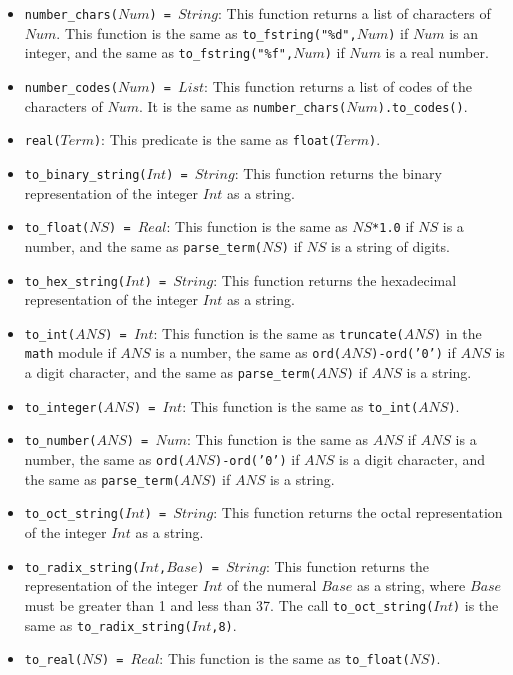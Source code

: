 \begin{itemize}
\item \texttt{number\_chars($Num$) = $String$}: This function returns a list of characters of $Num$. This function is the same as \texttt{to\_fstring("\%d",$Num$)} if $Num$ is an integer, and the same as \texttt{to\_fstring("\%f",$Num$)} if $Num$ is a real number.
\item \texttt{number\_codes($Num$) = $List$}: This function returns a list of codes of the characters of $Num$. It is the same as \texttt{number\_chars($Num$).to\_codes()}.
\item \texttt{real($Term$)}: This predicate is the same as \texttt{float($Term$)}.
\item \texttt{to\_binary\_string($Int$) = $String$}: This function returns the binary representation of the integer $Int$ as a string.
\item \texttt{to\_float($NS$) = $Real$}: This function is the same as \texttt{$NS$*1.0} if $NS$ is a number, and the same as \texttt{parse\_term($NS$)} if $NS$ is a string of digits.
\item \texttt{to\_hex\_string($Int$) = $String$}: This function returns the hexadecimal representation of the integer $Int$ as a string.
\item \texttt{to\_int($ANS$) = $Int$}: This function is the same as \texttt{truncate($ANS$)} in the \texttt{math} module if $ANS$ is a number, the same as \texttt{ord($ANS$)-ord('0')} if $ANS$ is a digit character, and the same as \texttt{parse\_term($ANS$)} if $ANS$ is a string.
\item \texttt{to\_integer($ANS$) = $Int$}: This function is the same as \texttt{to\_int($ANS$)}.
\item \texttt{to\_number($ANS$) = $Num$}: This function is the same as $ANS$ if $ANS$ is a number, the same as \texttt{ord($ANS$)-ord('0')} if $ANS$ is a digit character, and the same as \texttt{parse\_term($ANS$)} if $ANS$ is a string.
\item \texttt{to\_oct\_string($Int$) = $String$}:  This function returns the octal representation of the integer $Int$ as a string.
\item \texttt{to\_radix\_string($Int$,$Base$) = $String$}:  This function returns the representation of the integer $Int$ of the numeral $Base$ as a string, where $Base$ must be greater than 1 and less than 37. The call \texttt{to\_oct\_string($Int$)} is the same as \texttt{to\_radix\_string($Int$,8)}.
\item \texttt{to\_real($NS$) = $Real$}: This function is the same as \texttt{to\_float($NS$)}.
\end{itemize}
